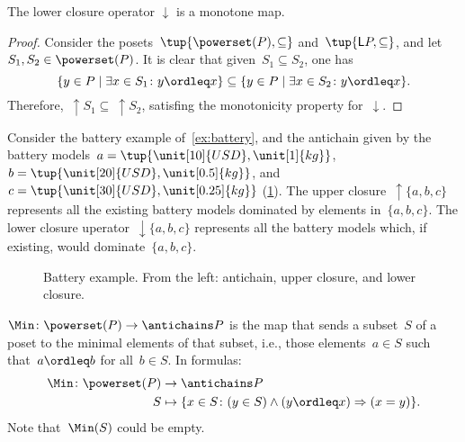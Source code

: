 \begin{lemma}
The lower closure operator $\downarrow$ is a monotone map.
\end{lemma}

\begin{proof}
Consider the posets~$\tup{\powerset(P),\subseteq}$ and~$\tup{\mathsf{L}P,\subseteq}$, and let~$S_1,S_2\in \powerset(P)$. It is clear that given~$S_1\subseteq S_2$, one has
\begin{equation}
    \{y\in P\mid \exists x\in S_1\colon y\ordleq x\} \subseteq \{y\in P\mid \exists x\in S_2\colon y\ordleq x\}.
\end{equation}
Therefore,~$\uparrow S_1\subseteq \ \uparrow S_2$, satisfing the monotonicity property for~$\downarrow$.
\end{proof}



\begin{example}
Consider the battery example of~\cref{ex:battery}, and the antichain given by the battery models~$a=\tup{\unit[10]{USD},\unit[1]{kg}}$,~$b=\tup{\unit[20]{USD},\unit[0.5]{kg}}$, and~$c=\tup{\unit[30]{USD},\unit[0.25]{kg}}$ (\cref{fig:examplebatt}).
The upper closure~$\uparrow \{a,b,c\}$ represents all the existing battery models dominated by elements in~$\{a,b,c\}$. The lower closure uperator~$\downarrow\{a,b,c\}$ represents all the battery models which, if existing, would dominate~$\{a,b,c\}$.
\begin{figure}[h!]
\begin{center}
\end{center}
\caption{Battery example. From the left: antichain, upper closure, and lower closure. \label{fig:examplebatt}}
\end{figure}
\end{example}


\begin{definition}[Min]
\label{def:Min}
$\Min \colon \powerset(P) \to \antichains P$ is the map that sends a subset~$S$ of a poset to the minimal elements of that subset, i.e., those elements~$a \in S$ such that~$a \ordleq b$ for all~$b \in S$. In formulas:
\begin{equation}
    \begin{aligned}
    \Min \colon \powerset(P) &\to \antichains P\\
    S&\mapsto \{ x\in S\colon (y\in S)\wedge(y\ordleq x)\Rightarrow (x=y)\}.
    \end{aligned}
\end{equation}
Note that~$\Min(S)$ could be empty.
\end{definition}

